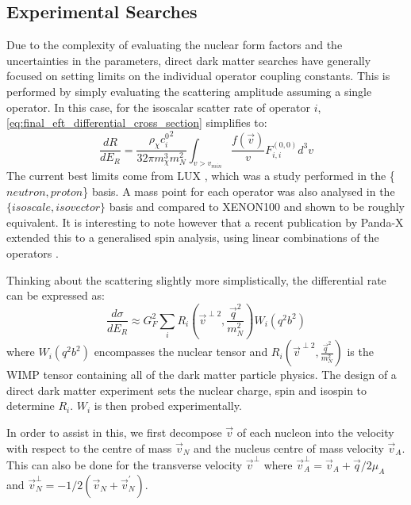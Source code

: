 \subsection{Experimental Searches}
\par
Due to the complexity of evaluating the nuclear form factors and the uncertainties in the parameters, direct dark matter searches have generally focused on setting limits on the individual operator coupling constants.
This is performed by simply evaluating the scattering amplitude assuming a single operator.
In this case, for the isoscalar scatter rate of operator $i$, \autoref{eq:final_eft_differential_cross_section} simplifies to:
\begin{equation}
    \frac{dR}{dE_R} = \frac{\rho_{\chi} {c_i^{0}}^2}{32 \pi m_\chi^3 m_N^2} \int_{v>v_{min}} \frac{f(\vec{v})}{v} F_{i,i}^{(0,0)} d^3 v
    \label{eq:final_eft_differential_cross_section}
\end{equation}
The current best limits come from LUX \cite{LUX_RUN4_EFT_2021}, which was a study performed in the \{$neutron,proton$\} basis.
A mass point for each operator was also analysed in the $\{isoscale, isovector\}$ basis and compared to XENON100 \cite{xenon100_eft_ref} and shown to be roughly equivalent.
It is interesting to note however that a recent publication by Panda-X extended this to a generalised spin analysis, using linear combinations of the operators \cite{pandax_2_eft_ref}.

\par
Thinking about the scattering slightly more simplistically, the differential rate can be expressed as:
\begin{equation}
    \frac{d\sigma}{dE_R} \approx G_F^2 \sum_{i} R_i (\vec{v}^{\perp 2}, \frac{\vec{q}^2}{m_N^2}) W_i(q^2b^2)
\end{equation}
where $W_i(q^2b^2)$ encompasses the nuclear tensor and $R_i (\vec{v}^{\perp 2}, \frac{\vec{q}^2}{m_N^2})$ is the WIMP tensor containing all of the dark matter particle physics.
The design of a direct dark matter experiment sets the nuclear charge, spin and isospin to determine $R_i$.
$W_i$ is then probed experimentally.



\iffalse


In order to assist in this, we first decompose $\vec{v}$ of each nucleon into the velocity with respect to the centre of mass $\vec{v}_{N}$ and the nucleus centre of mass velocity $\vec{v}_{A}$.
This can also be done for the transverse velocity $\vec{v}^{\perp}$ where $\vec{v}^{\perp}_{A}=\vec{v}_A + \vec{q}/2\mu_{A}$ and $\vec{v}^{\perp}_{N}=-1/2(\vec{v}_{N} + \vec{v}^{'}_{N})$.

